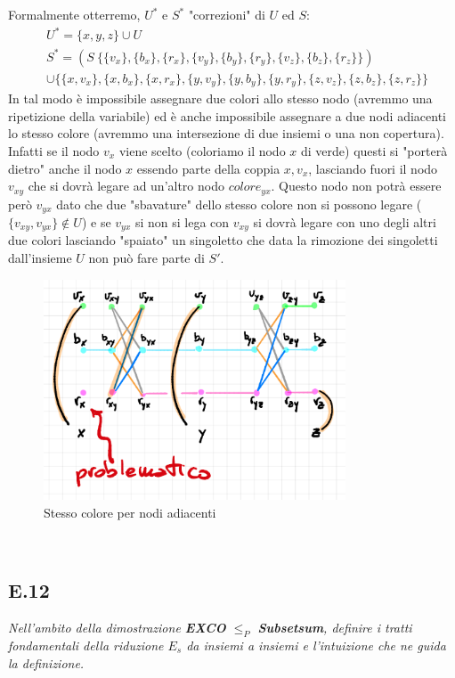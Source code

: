 \documentclass[a4paper]{article}
\begin{document}
Formalmente otterremo, $U^*$ e $S^*$ "correzioni" di $U$ ed $S$:
\begin{align*}
&	U^* = \{x, y, z\} \cup U \\
& 	S^* = (S \ \{\{v_x\}, \{b_x\}, \{r_x\}, \{v_y\}, \{b_y\}, \{r_y\}, \{v_z\}, \{b_z\}, \{r_z\}\}) \\
&	\cup \{\{x, v_x\}, \{x, b_x\}, \{x, r_x\}, \{y, v_y\}, \{y, b_y\}, \{y, r_y\}, \{z, v_z\}, \{z, b_z\}, \{z, r_z\}\}
\end{align*}
In tal modo è impossibile assegnare due colori allo stesso nodo (avremmo una ripetizione della variabile) ed è anche impossibile assegnare a due nodi adiacenti lo stesso colore (avremmo una intersezione di due insiemi o una non copertura).
Infatti se il nodo $v_x$ viene scelto (coloriamo il nodo $x$ di verde) questi si "porterà dietro" anche il nodo $x$ essendo parte della coppia ${x,v_x}$, lasciando fuori il nodo $v_{xy}$ che si dovrà legare ad un'altro nodo $colore_{yx}$.
Questo nodo non potrà essere però $v_{yx}$ dato che due "sbavature" dello stesso colore non si possono legare ($\{v_{xy}, v_{yx}\} \not\in U$) e se $v_{yx}$ si non si lega con $v_{xy}$ si dovrà legare con uno degli altri due colori lasciando "spaiato" un singoletto che data la rimozione dei singoletti dall'insieme $U$ non può fare parte di $S'$.
\begin{figure}[!ht]
                \centering
                \includegraphics[width = 0.8\textwidth]{./img/E11_sameCol.png}
                \caption{Stesso colore per nodi adiacenti} \label{FIG:E11_sameCol}
\end{figure}\\


\subsection{E.12}
\emph{Nell’ambito della dimostrazione \textbf{EXCO} $\leq_P$ \textbf{Subsetsum}, definire i tratti fondamentali della riduzione $E_s$ da insiemi a insiemi e l’intuizione che ne guida la definizione.}
\end{document}
